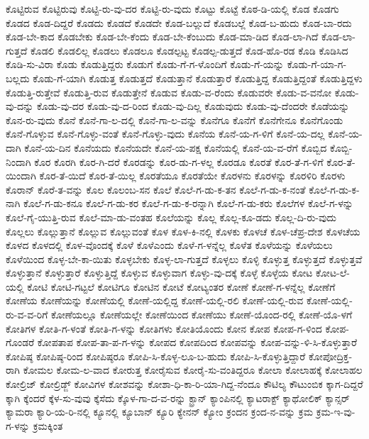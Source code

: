 {ಕೊಟ್ಟಿರುವ
ಕೊಟ್ಟಿರುವು
ಕೊಟ್ಟಿ-ರು-ವು-ದರ
ಕೊಟ್ಟಿ-ರು-ವುದು
ಕೊಟ್ಟು
ಕೊಟ್ಟೆ
ಕೊಠ-ಡಿ-ಯಲ್ಲಿ
ಕೊಡ
ಕೊಡಗು
ಕೊಡದ
ಕೊಡ-ದಿದ್ದರೆ
ಕೊಡದು
ಕೊಡದೆ
ಕೊಡದೇ
ಕೊಡ-ಬಲ್ಲುದೆ
ಕೊಡಬಲ್ಲೆ
ಕೊಡ-ಬ-ಹುದು
ಕೊಡ-ಬಾ-ರದು
ಕೊಡ-ಬೇ-ಕಾದ
ಕೊಡಬೇಕು
ಕೊಡ-ಬೇ-ಕೆಂದು
ಕೊಡ-ಬೇ-ಕೆಂಬುದು
ಕೊಡ-ಮಾ-ಡಿದ
ಕೊಡ-ಲಾ-ಗಿದೆ
ಕೊಡ-ಲಾ-ಗುತ್ತದೆ
ಕೊಡಲಿ
ಕೊಡಲಿಲ್ಲ
ಕೊಡಲು
ಕೊಡಲೂ
ಕೊಡಲ್ಪಟ್ಟ
ಕೊಡಲ್ಪ-ಡುತ್ತದೆ
ಕೊಡ-ಹೊ-ರಡ
ಕೊಡಿ
ಕೊಡಿಸಿದ
ಕೊಡಿ-ಸು-ವಿರಾ
ಕೊಡು
ಕೊಡುತ್ತಿದ್ದರು
ಕೊಡುಗೆ
ಕೊಡು-ಗೆ-ಗ-ಳೊಂದಿಗೆ
ಕೊಡು-ಗೆ-ಯನ್ನು
ಕೊಡು-ಗೆ-ಯಾ-ಗ-ಬಲ್ಲದು
ಕೊಡು-ಗೆ-ಯಾಗಿ
ಕೊಡುತ್ತ
ಕೊಡುತ್ತದೆ
ಕೊಡುತ್ತಾನೆ
ಕೊಡುತ್ತಾರೆ
ಕೊಡುತ್ತಿದ್ದ
ಕೊಡುತ್ತಿದ್ದಂತೆ
ಕೊಡುತ್ತಿದ್ದಳು
ಕೊಡುತ್ತಿ-ರುತ್ತೇವೆ
ಕೊಡುತ್ತಿ-ರುವ
ಕೊಡುತ್ತೇನೆ
ಕೊಡುವ
ಕೊಡು-ವ-ರೆಂದು
ಕೊಡುವರೇ
ಕೊಡು-ವ-ವನೋ
ಕೊಡು-ವು-ದನ್ನು
ಕೊಡು-ವು-ದರ
ಕೊಡು-ವು-ದ-ರಿಂದ
ಕೊಡು-ವು-ದಿಲ್ಲ
ಕೊಡುವುದು
ಕೊಡು-ವು-ದೆಂದರೇ
ಕೊಡೆಯನ್ನು
ಕೊನ-ರು-ವುದು
ಕೊನೆ
ಕೊನೆ-ಗಾ-ಲ-ದಲ್ಲಿ
ಕೊನೆ-ಗಾ-ಲ-ವನ್ನು
ಕೊನೆಗೂ
ಕೊನೆಗೆ
ಕೊನೆಗೇನೂ
ಕೊನೆಗೊಂಡು
ಕೊನೆ-ಗೊಳ್ಳುವ
ಕೊನೆ-ಗೊಳ್ಳು-ವಂತೆ
ಕೊನೆ-ಗೊಳ್ಳು-ವುದು
ಕೊನೆಯ
ಕೊನೆ-ಯ-ಗ-ಳಿಗೆ
ಕೊನೆ-ಯ-ದಲ್ಲ
ಕೊನೆ-ಯ-ದಾಗಿ
ಕೊನೆ-ಯ-ದಿನ
ಕೊನೆಯದು
ಕೊನೆಯದೇ
ಕೊನೆ-ಯ-ಪಕ್ಷ
ಕೊನೆಯಲ್ಲಿ
ಕೊನೆ-ಯ-ವ-ರೆಗೆ
ಕೊಬ್ಬಿದ
ಕೊಬ್ಬಿ-ನಿಂದಾಗಿ
ಕೊರ
ಕೊರಗಿ
ಕೊರ-ಗಿ-ದರೆ
ಕೊರಡನ್ನು
ಕೊರ-ಡು-ಗ-ಳಲ್ಲ
ಕೊರಡೂ
ಕೊರತೆ
ಕೊರ-ತೆ-ಗ-ಳಿಗೆ
ಕೊರ-ತೆ-ಯಿಂದಾಗಿ
ಕೊರ-ತೆ-ಯಿದೆ
ಕೊರ-ತೆ-ಯಿಲ್ಲ
ಕೊರತೆಯೂ
ಕೊರತೆಯೇ
ಕೊರಳನು
ಕೊರಳನ್ನು
ಕೊರಳಿರಿ
ಕೊರಳು
ಕೊರಾನ್
ಕೊರೆ-ತ-ವನ್ನು
ಕೊಲ
ಕೊಲಂಬ-ಸನ
ಕೊಲೆ
ಕೊಲೆ-ಗ-ಡು-ಕ-ತನ
ಕೊಲೆ-ಗ-ಡು-ಕ-ನಂತೆ
ಕೊಲೆ-ಗ-ಡು-ಕ-ನಾಗಿ
ಕೊಲೆ-ಗ-ಡು-ಕನೂ
ಕೊಲೆ-ಗ-ಡು-ಕರ
ಕೊಲೆ-ಗ-ಡು-ಕ-ರನ್ನಾಗಿ
ಕೊಲೆ-ಗ-ಡು-ಕರು
ಕೊಲೆಗಳ
ಕೊಲೆ-ಗ-ಳನ್ನು
ಕೊಲೆ-ಗೈ-ಯುತ್ತಿ-ರುವ
ಕೊಲೆ-ಮಾ-ಡು-ವಂತಹ
ಕೊಲೆಯನ್ನು
ಕೊಲ್ಲ
ಕೊಲ್ಲ-ಕೂ-ಡದು
ಕೊಲ್ಲ-ದಿ-ರು-ವುದು
ಕೊಲ್ಲಲು
ಕೊಲ್ಲುತ್ತಾನೆ
ಕೊಲ್ಲುವ
ಕೊಲ್ಲುವಂತೆ
ಕೊಳ
ಕೊಳ-ಕಿ-ನಲ್ಲಿ
ಕೊಳಕು
ಕೊಳಚೆ
ಕೊಳ-ಚೆಪ್ರ-ದೇಶ
ಕೊಳಚೆಯ
ಕೊಳದ
ಕೊಳದಲ್ಲಿ
ಕೊಳ-ವೊಂದಕ್ಕೆ
ಕೊಳೆ
ಕೊಳೆಎಂದು
ಕೊಳೆ-ಗ-ಳನ್ನೆಲ್ಲ
ಕೊಳೆತ
ಕೊಳೆಯನ್ನು
ಕೊಳೆಯಲು
ಕೊಳೆಯಿಂದ
ಕೊಳ್ಳ-ಬೇ-ಕಾ-ಯಿತು
ಕೊಳ್ಳಬೇಕು
ಕೊಳ್ಳ-ಲಾ-ಗುತ್ತದೆ
ಕೊಳ್ಳಲು
ಕೊಳ್ಳಿ
ಕೊಳ್ಳುತ್ತ
ಕೊಳ್ಳುತ್ತದೆ
ಕೊಳ್ಳುತ್ತವೆ
ಕೊಳ್ಳುತ್ತಾನೆ
ಕೊಳ್ಳುತ್ತಾರೆ
ಕೊಳ್ಳುತ್ತಿದ್ದೆ
ಕೊಳ್ಳುವ
ಕೊಳ್ಳುವಾಗ
ಕೊಳ್ಳು-ವು-ದಕ್ಕೆ
ಕೊಳ್ಳೆ
ಕೊಳ್ಳೆಯ
ಕೋಟ
ಕೋಟ-ಲೆ-ಯಲ್ಲಿ
ಕೋಟಿ
ಕೋಟಿ-ಗಟ್ಟಲೆ
ಕೋಟಿಗೂ
ಕೋಟಿನ
ಕೋಟೆ
ಕೋಟ್ಯಂತರ
ಕೋಣೆ
ಕೋಣೆ-ಗ-ಳನ್ನೆಲ್ಲ
ಕೋಣೆಗೆ
ಕೋಣೆಯ
ಕೋಣೆಯನ್ನು
ಕೋಣೆಯಲ್ಲಿ
ಕೋಣೆ-ಯಲ್ಲಿದ್ದ
ಕೋಣೆ-ಯಲ್ಲಿ-ರಲಿ
ಕೋಣೆ-ಯಲ್ಲಿ-ರುವ
ಕೋಣೆ-ಯಲ್ಲಿ-ರು-ವ-ವ-ರಿಗೆ
ಕೋಣೆಯಲ್ಲೂ
ಕೋಣೆಯಲ್ಲೇ
ಕೋಣೆಯಿಂದ
ಕೋಣೆಯು
ಕೋಣೆ-ಯೊಂದ-ರಲ್ಲಿ
ಕೋಣೆ-ಯೊ-ಳಗೆ
ಕೋತಿಗಳ
ಕೋತಿ-ಗ-ಳಂತೆ
ಕೋತಿ-ಗ-ಳನ್ನು
ಕೋತಿಗಳು
ಕೋತಿಯೊಂದು
ಕೋನ
ಕೋಪ
ಕೋಪ-ಗ-ಳಿಂದ
ಕೋಪ-ಗೊಂಡರೆ
ಕೋಪತಾಪ
ಕೋಪ-ತಾ-ಪ-ಗ-ಳನ್ನು
ಕೋಪದ
ಕೋಪದಿಂದ
ಕೋಪವನ್ನು
ಕೋಪ-ವನ್ನು-ಳಿ-ಸಿ-ಕೊಳ್ಳುತ್ತಾರೆ
ಕೋಪಿಷ್ಠ
ಕೋಪಿಷ್ಠ-ರಿಂದ
ಕೋಪಿಷ್ಠರೂ
ಕೋಪಿ-ಸಿ-ಕೊಳ್ಳ-ಲೂ-ಬ-ಹುದು
ಕೋಪಿ-ಸಿ-ಕೊಳ್ಳುತ್ತಿದ್ದಾರೆ
ಕೋಪೋದ್ರಿಕ್ತ-ರಾಗಿ
ಕೋಮಲ
ಕೋಮ-ಲ-ವಾದ
ಕೋರುತ್ತ
ಕೋರೈಸುವ
ಕೋರೈ-ಸು-ವಂತಿದ್ದರೂ
ಕೋಲಾ
ಕೋಲಾಹಕ್ಕೆ
ಕೋಲಾಹಲ
ಕೋಲ್ರಿಜ್
ಕೋಲ್ರಿಡ್ಜ್
ಕೋವಿಗಳ
ಕೋಶವನ್ನು
ಕೋಶಾ-ಧಿ-ಕಾ-ರಿ-ಯಾ-ಗಿದ್ದ-ನೆಂದೂ
ಕೌಟಿಲ್ಯ
ಕೌಟುಂಬಿಕ
ಕ್ಕಾಗ-ದಿದ್ದರೆ
ಕ್ಕಾಗಿ
ಕ್ಕೆಂದರೆ
ಕ್ಕೆಳ-ಸು-ವುವು
ಕ್ಕೆಸೆದು
ಕ್ಕೊಳ-ಗಾ-ದ-ವ-ರನ್ನು
ಕ್ಟ್ರಾನ್
ಕ್ಯಾಂಪಿನಲ್ಲಿ
ಕ್ಯಾಟರಾಕ್ಟ್
ಕ್ಯಾಥೋಲಿಕ್
ಕ್ಯಾನ್ಸರ್
ಕ್ಯಾಮರಾ
ಕ್ಯಾರಿ-ಯ-ರಿ-ನಲ್ಲಿ
ಕ್ಯೂನಲ್ಲಿ
ಕ್ಯೂಬಾನ್
ಕ್ಯೂರಿ
ಕ್ಯೇನನ್
ಕ್ಯೋಂ
ಕ್ರಂದನ
ಕ್ರಂದ-ನ-ವನ್ನು
ಕ್ರಮ
ಕ್ರಮ-ಇ-ವು-ಗ-ಳನ್ನು
ಕ್ರಮಕ್ಕಿಂತ
}
